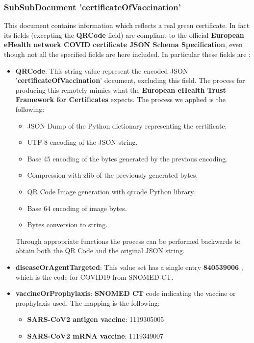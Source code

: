 \documentclass{article}[IEEEtran]
\begin{document}
\subsubsection{SubSubDocument 'certificateOfVaccination'}

This document contains information which reflects a real green certificate. In fact its fields (excepting the \textbf{QRCode} field) are compliant to the official \textbf{European eHealth network COVID certificate JSON Schema Specification}\cite{euDigitalCovid}, even though not all the specified fields are here included. In particular these fields are :

    \begin{itemize}
        \item \textbf{QRCode}: This string value represent the encoded JSON '\textbf{certificateOfVaccination}' document, excluding this field. The process for producing this remotely mimics what the \textbf{European eHealth Trust Framework for Certificates}\cite{euSecurity} expects. The process we applied is the following:
        
        \begin{itemize}
            \item JSON Dump of the Python dictionary representing the certificate.
            \item UTF-8 encoding of the JSON string.
            \item Base 45 encoding of the bytes generated by the previous encoding.
            \item Compression with zlib of the previously generated bytes.
            \item QR Code Image generation with qrcode Python library.
            \item Base 64 encoding of image bytes.
            \item Bytes conversion to string.
        \end{itemize}
        
        Through appropriate functions the process can be performed backwards to obtain both the QR Code and the original JSON string.
        
        \item \textbf{diseaseOrAgentTargeted}: This value set has a single entry \textbf{840539006} , which is the code for COVID19 from 
        SNOMED CT.
        \item \textbf{vaccineOrProphylaxis}: \textbf{SNOMED CT} code indicating the vaccine or prophylaxis used. The mapping is the following: 
        \begin{itemize}
            \item \textbf{SARS-CoV2 antigen vaccine}: 1119305005
            \item \textbf{SARS-CoV2 mRNA vaccine}: 1119349007
        \end{itemize}
        

\end{itemize}
\end{document}
